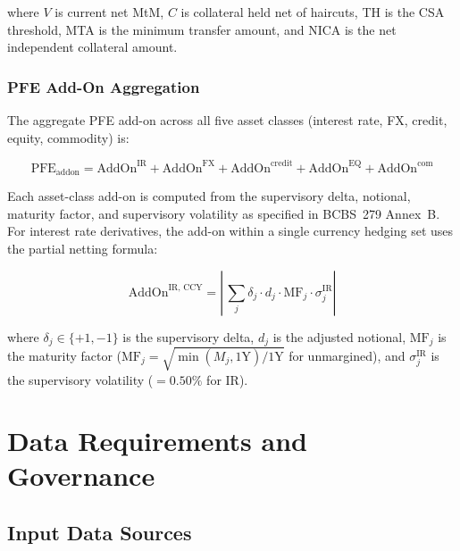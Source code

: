 \documentclass[11pt,a4paper]{article}
\begin{document}
where $V$ is current net MtM, $C$ is collateral held net of haircuts, TH is
the CSA threshold, MTA is the minimum transfer amount, and NICA is the
net independent collateral amount.

\subsubsection{PFE Add-On Aggregation}

The aggregate PFE add-on across all five asset classes (interest rate, FX,
credit, equity, commodity) is:

\begin{equation}
  \text{PFE}_{\text{addon}} = \text{AddOn}^{\text{IR}}
    + \text{AddOn}^{\text{FX}}
    + \text{AddOn}^{\text{credit}}
    + \text{AddOn}^{\text{EQ}}
    + \text{AddOn}^{\text{com}}
  \label{eq:pfe_addon}
\end{equation}

Each asset-class add-on is computed from the supervisory delta, notional,
maturity factor, and supervisory volatility as specified in BCBS~279 Annex~B.
For interest rate derivatives, the add-on within a single currency hedging set
uses the partial netting formula:

\begin{equation}
  \text{AddOn}^{\text{IR, CCY}}
    = \left|\, \sum_j \delta_j \cdot d_j \cdot \text{MF}_j \cdot \sigma^{\text{IR}}_j
      \right|
  \label{eq:ir_addon}
\end{equation}

where $\delta_j \in \{+1, -1\}$ is the supervisory delta, $d_j$ is the
adjusted notional, $\text{MF}_j$ is the maturity factor
($\text{MF}_j = \sqrt{\min(M_j, 1\text{Y}) / 1\text{Y}}$ for unmargined), and
$\sigma^{\text{IR}}_j$ is the supervisory volatility ($= 0.50\%$ for IR).

\section{Data Requirements and Governance}

\subsection{Input Data Sources}
\end{document}

